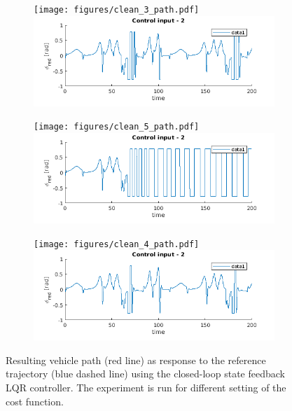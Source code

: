 \begin{figure}[h!]
\begin{subfigure}{0.32\textwidth}
	\end{subfigure}
	\begin{subfigure}{0.32\textwidth}
		\texttt{[image: figures/clean\_3\_path.pdf]}
		\includegraphics[width=\textwidth]{figures/clean_3_input.png}
	\end{subfigure}
	\begin{subfigure}{0.32\textwidth}
		\texttt{[image: figures/clean\_5\_path.pdf]}
		\includegraphics[width=\textwidth]{figures/clean_5_input.png}
	\end{subfigure}
	\begin{subfigure}{0.32\textwidth}
		\texttt{[image: figures/clean\_4\_path.pdf]}
		\includegraphics[width=\textwidth]{figures/clean_4_input.png}
	\end{subfigure}
	\caption{Resulting vehicle path (red line) as response to the reference trajectory (blue dashed line) using the closed-loop state feedback LQR controller. The experiment is run for different setting of the cost function.}
	\label{fig:lqr_closed_results}
\end{figure}

